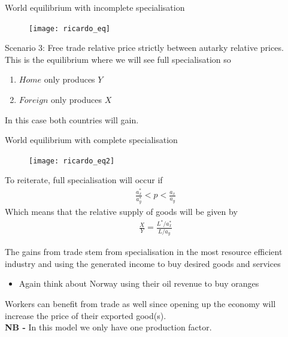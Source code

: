 \documentclass{beamer}
\begin{document}
\begin{frame}{World equilibrium with incomplete specialisation}
  \begin{figure}
    \texttt{[image: ricardo\_eq]}
  \end{figure}
\end{frame}

\begin{frame}
  Scenario 3: Free trade relative price strictly between autarky relative prices.\\
  This is the equilibrium where we will see full specialisation so
  \begin{enumerate}
    \item $Home$ only produces $Y$
    \item $Foreign$ only produces $X$
  \end{enumerate}
  \medskip
  In this case both countries will gain.   
\end{frame}

\begin{frame}{World equilibrium with complete specialisation}
  \begin{figure}
    \texttt{[image: ricardo\_eq2]}
  \end{figure}
\end{frame}

\begin{frame}
  To reiterate, full specialisation will occur if 
  \begin{align*}
    \frac{a_x^*}{a_y^*}<p<\frac{a_x}{a_y}    
  \end{align*}
  \medskip
  Which means that the relative supply of goods will be given by 
  \begin{align*}
    \frac{X}{Y}=\frac{L^*/a_x^*}{L/a_y}
  \end{align*}
\end{frame}

\begin{frame}
  The gains from trade stem from specialisation in the most resource efficient industry and using the generated income to buy desired goods and services
  \begin{itemize}
    \item Again think about Norway using their oil revenue to buy oranges
  \end{itemize}
  Workers can benefit from trade as well since opening up the economy will increase the price of their exported good(s).\\
  \medskip
  \textbf{NB -} In this model we only have one production factor. 
\end{frame}
\end{document}

